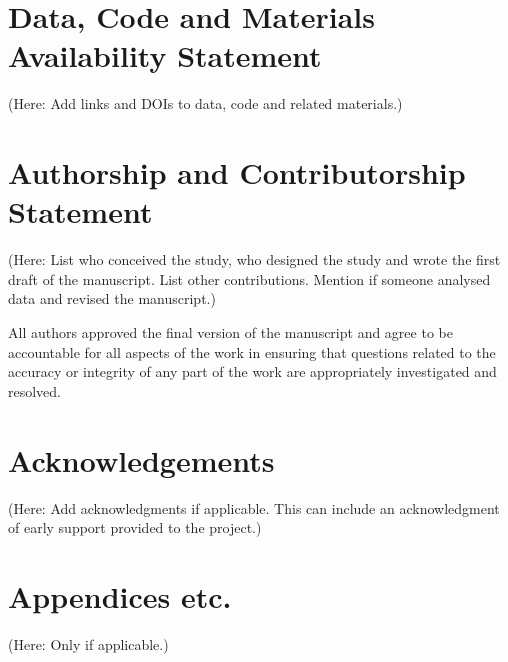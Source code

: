 \documentclass{ldr-article}
\begin{document}
\printbibliography

\section{Data, Code and Materials Availability Statement}

(Here: Add links and DOIs to data, code and related materials.)

\section{Authorship and Contributorship Statement}

(Here: List who conceived the study, who designed the study and wrote the first draft of the manuscript. List other contributions. Mention if someone analysed data and revised the manuscript.)

All authors approved the final version of the manuscript and agree to be accountable for all aspects of the work in ensuring that questions related to the accuracy or integrity of any part of the work are appropriately investigated and resolved.

\section{Acknowledgements}

(Here: Add acknowledgments if applicable. This can include an acknowledgment of early support provided to the project.)

\clearpage
\appendix

\section{Appendices etc.}

(Here: Only if applicable.)
\end{document}
